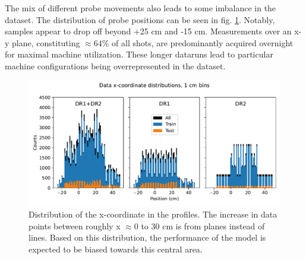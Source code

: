 The mix of different probe movements also leads to some imbalance in the dataset. The distribution of probe positions can be seen in fig. \ref{fig:PP1_02_x_distribution}. Notably, samples appear to drop off beyond +25 cm and -15 cm. Measurements over an x-y plane, constituting $\approx 64\%$ of all shots, are predominantly acquired overnight for maximal machine utilization. These longer dataruns lead to particular machine configurations being overrepresented in the dataset. 

\begin{figure}
	\centering
	\includegraphics[width=\linewidth]{figures/PP1_02_x_distribution.pdf}
	\caption[Distribution of probe x-coordinates in the dataset]{\label{fig:PP1_02_x_distribution}Distribution of the x-coordinate in the profiles. The increase in data points between roughly x $\approx 0$ to 30 cm is from planes instead of lines. Based on this distribution, the performance of the model is expected to be biased towards this central area.}
\end{figure}

